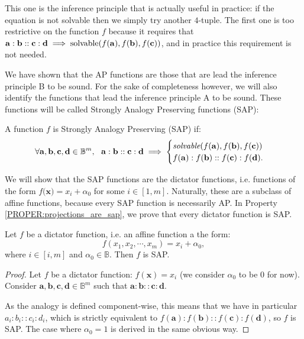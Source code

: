 This one is the inference principle that is actually useful in practice: if the
equation is not solvable then we simply try another $4$-tuple. The first one is
too restrictive on the function $f$ because it requires that $\mathbf{a} :
\mathbf{b} :: \mathbf{c} : \mathbf{d} \implies  \text{solvable}(f(\mathbf{a}),
f(\mathbf{b}), f(\mathbf{c}))$, and in practice this requirement is not
needed.

We have shown that the AP functions are those that are lead the inference
principle B to be sound.  For the sake of completeness however, we will also
identify the functions that lead the inference principle A to be sound. These
functions will be called Strongly Analogy Preserving functions (SAP):

\begin{definition}
  A function $f$ is Strongly Analogy Preserving (SAP) if:
  $$\forall \mathbf{a}, \mathbf{b}, \mathbf{c}, \mathbf{d} \in \mathbb{B}^m, ~~
  \mathbf{a}: \mathbf{b}:: \mathbf{c}: \mathbf{d} \implies
  \begin{cases}
    \emph{solvable}(f(\mathbf{a}), f(\mathbf{b}), f(\mathbf{c}))\\
     f(\mathbf{a}) : f(\mathbf{b}) :: f(\mathbf{c}) : f(\mathbf{d}).
  \end{cases}$$
\end{definition}

We will show that the SAP functions are the dictator functions, i.e. functions
of the form $f(\mathbf{x)} = x_i + \alpha_0$ for some $i \in [1, m]$.
Naturally, these are a subclass of affine functions, because every SAP function
is necessarily AP. In Property \ref{PROPER:projections_are_sap}, we prove that
every dictator function  is SAP.

\begin{property}
  \label{PROPER:projections_are_sap}
  Let $f$ be a dictator function, i.e. an affine function a the form:
  $$f(x_1, x_2, \cdots, x_m) = x_i + \alpha_0,$$
  where $i \in [i, m]$ and $\alpha_0 \in \mathbb{B}$. Then $f$ is SAP.
\end{property}
\begin{proof}
  Let $f$ be a dictator function: $f(\mathbf{x}) = x_i$ (we consider $\alpha_0$
  to be $0$ for now). Consider $\mathbf{a}, \mathbf{b}, \mathbf{c}, \mathbf{d}
  \in \mathbb{B}^m$ such that $\mathbf{a}: \mathbf{b}:: \mathbf{c}:
  \mathbf{d}$.

  As the analogy is defined component-wise, this means that we have in
  particular $a_i : b_i :: c_i : d_i$, which is strictly equivalent to
  $f(\mathbf{a}) : f(\mathbf{b}) :: f(\mathbf{c}) : f(\mathbf{d})$, so $f$ is
  SAP. The case where $\alpha_0 = 1$ is derived in the same obvious way.
\end{proof}

